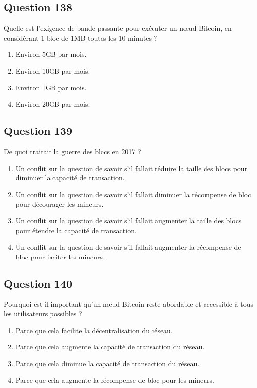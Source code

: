 \documentclass[12pt,a4paper]{article}
\begin{document}
\bigskip


\subsection*{Question 138}
Quelle est l'exigence de bande passante pour exécuter un nœud Bitcoin, en considérant 1 bloc de 1MB toutes les 10 minutes ?

\begin{enumerate}[label=\Alph*., leftmargin=*]
\item Environ 5GB par mois.
\item Environ 10GB par mois.
\item Environ 1GB par mois.
\item Environ 20GB par mois.
\end{enumerate}

\bigskip


\subsection*{Question 139}
De quoi traitait la guerre des blocs en 2017 ?

\begin{enumerate}[label=\Alph*., leftmargin=*]
\item Un conflit sur la question de savoir s'il fallait réduire la taille des blocs pour diminuer la capacité de transaction.
\item Un conflit sur la question de savoir s'il fallait diminuer la récompense de bloc pour décourager les mineurs.
\item Un conflit sur la question de savoir s'il fallait augmenter la taille des blocs pour étendre la capacité de transaction.
\item Un conflit sur la question de savoir s'il fallait augmenter la récompense de bloc pour inciter les mineurs.
\end{enumerate}

\bigskip


\subsection*{Question 140}
Pourquoi est-il important qu'un nœud Bitcoin reste abordable et accessible à tous les utilisateurs possibles ?

\begin{enumerate}[label=\Alph*., leftmargin=*]
\item Parce que cela facilite la décentralisation du réseau.
\item Parce que cela augmente la capacité de transaction du réseau.
\item Parce que cela diminue la capacité de transaction du réseau.
\item Parce que cela augmente la récompense de bloc pour les mineurs.
\end{enumerate}
\end{document}
